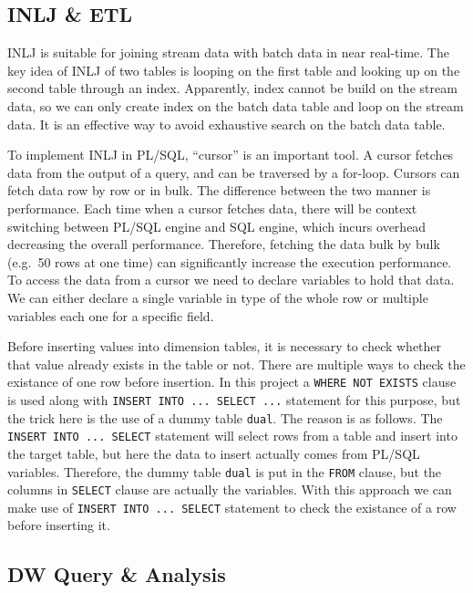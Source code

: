 \documentclass[
  a4paper,
]{article}
\begin{document}
\hypertarget{inlj-etl}{%
\subsection{INLJ \& ETL}\label{inlj-etl}}

INLJ is suitable for joining stream data with batch data in near
real-time. The key idea of INLJ of two tables is looping on the first
table and looking up on the second table through an index. Apparently,
index cannot be build on the stream data, so we can only create index on
the batch data table and loop on the stream data. It is an effective way
to avoid exhaustive search on the batch data table.

To implement INLJ in PL/SQL, ``cursor'' is an important tool. A cursor
fetches data from the output of a query, and can be traversed by a
for-loop. Cursors can fetch data row by row or in bulk. The difference
between the two manner is performance. Each time when a cursor fetches
data, there will be context switching between PL/SQL engine and SQL
engine, which incurs overhead decreasing the overall performance.
Therefore, fetching the data bulk by bulk (e.g.~50 rows at one time) can
significantly increase the execution performance. To access the data
from a cursor we need to declare variables to hold that data. We can
either declare a single variable in type of the whole row or multiple
variables each one for a specific field.

Before inserting values into dimension tables, it is necessary to check
whether that value already exists in the table or not. There are
multiple ways to check the existance of one row before insertion. In
this project a \texttt{WHERE\ NOT\ EXISTS} clause is used along with
\texttt{INSERT\ INTO\ ...\ SELECT\ ...} statement for this purpose, but
the trick here is the use of a dummy table \texttt{dual}. The reason is
as follows. The \texttt{INSERT\ INTO\ ...\ SELECT} statement will select
rows from a table and insert into the target table, but here the data to
insert actually comes from PL/SQL variables. Therefore, the dummy table
\texttt{dual} is put in the \texttt{FROM} clause, but the columns in
\texttt{SELECT} clause are actually the variables. With this approach we
can make use of \texttt{INSERT\ INTO\ ...\ SELECT} statement to check
the existance of a row before inserting it.

\hypertarget{dw-query-analysis}{%
\subsection{DW Query \& Analysis}\label{dw-query-analysis}}
\end{document}
